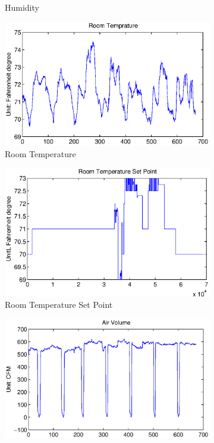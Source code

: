 \begin{figure}[ht!]
\begin{subfigure}{0.32\textwidth}
                \caption{Humidity}
  \end{subfigure}
  \begin{subfigure}{0.32\textwidth}
                \centering
    \includegraphics[width=\textwidth]{./fig/rmt.eps}
                \caption{Room Temperature}
  \end{subfigure}
  \begin{subfigure}{0.32\textwidth}
                \centering
    \includegraphics[width=\textwidth]{./fig/stpt.eps}
                \caption{Room Temperature Set Point}
  \end{subfigure}
  \begin{subfigure}{0.32\textwidth}
                \centering
    \includegraphics[width=\textwidth]{./fig/vav.eps}

\end{subfigure}
\end{figure}
